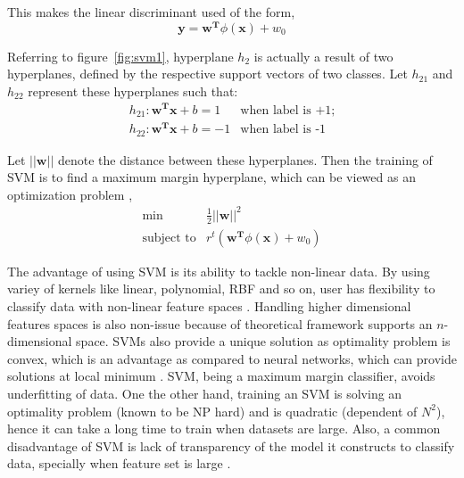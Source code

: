 This makes the linear discriminant used of the form,
\[\boldsymbol{y} = \boldsymbol{w^T}\phi(\boldsymbol{x}) + w_0 \]

Referring to figure~\ref{fig:svm1}, hyperplane $h_2$ is actually a result of two hyperplanes, defined by the respective support vectors of two classes. Let $h_{21}$ and $h_{22}$ represent these hyperplanes	such that:
\[\begin{array}{ll} 
h_{21}: \boldsymbol{w^T}\boldsymbol{x} + b = 1 & \mbox{when label is +1};\\
h_{22}: \boldsymbol{w^T}\boldsymbol{x} + b = -1 & \mbox{when label is -1}
\end{array} \]

Let $||\boldsymbol{w}||$ denote the distance between these hyperplanes. Then the training of SVM is to find a maximum margin hyperplane, which can be viewed as an optimization problem \cite{Vapnik1995, Chang2011},
\[\begin{array}{ll} 
 \min &\frac{1}{2} ||\boldsymbol{w}||^2 \\
 \mbox{subject to} & r^t(\boldsymbol{w^T}\phi(\boldsymbol{x}) + w_0) 
\end{array}\]

The advantage of using SVM is its ability to tackle non-linear data. By using variey of kernels like linear, polynomial, RBF and so on, user has flexibility to classify data with non-linear feature spaces \cite {Chang2011}. Handling higher dimensional features spaces is also non-issue because of theoretical framework \cite{Vapnik1995} supports an $n$-dimensional space. SVMs also provide a unique solution as optimality problem is convex, which is an advantage as compared to neural networks, which can provide solutions at local minimum \cite{Auria2008}. SVM, being a maximum margin classifier, avoids underfitting of data. One the other hand, training an SVM is solving an optimality problem (known to be NP hard) and is quadratic (dependent of $N^2$), hence it can take a long time to train when datasets are large. Also, a common disadvantage of SVM is lack of transparency of the model it constructs to classify data, specially when feature set is large \cite{Auria2008}.
